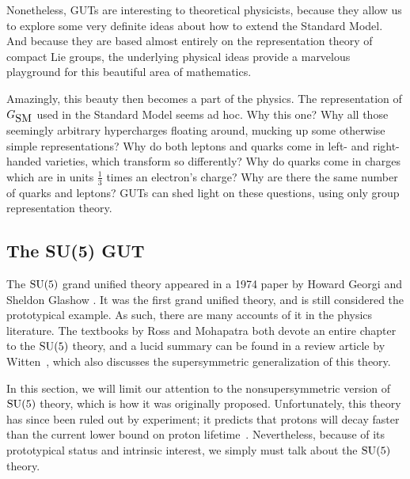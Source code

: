 \documentclass[12pt]{article}
\newcommand{\SU}{{\rm SU}}    %
\newcommand{\third}{\frac{1}{3}} %
\newcommand{\GSM}{{G_{\mbox{\rm SM}}}}  %
\begin{document}
Nonetheless, GUTs are interesting to theoretical physicists, because
they allow us to explore some very definite ideas about how to extend
the Standard Model. And because they are based almost entirely on the
representation theory of compact Lie groups, the underlying physical
ideas provide a marvelous playground for this beautiful area of
mathematics.

Amazingly, this beauty then becomes a part of the physics.  The
representation of $\GSM$ used in the Standard Model seems ad hoc.  Why
this one?  Why all those seemingly arbitrary hypercharges floating
around, mucking up some otherwise simple representations? Why do both
leptons and quarks come in left- and right-handed varieties, which
transform so differently?  Why do quarks come in charges which are in
units $\third$ times an electron's charge? Why are there the same
number of quarks and leptons?  GUTs can shed light on these questions,
using only group representation theory.

\subsection{The {\rm{SU(5)}} GUT} \label{sec:su(5)}

The $\SU(5)$ grand unified theory appeared in a 1974 paper by Howard
Georgi and Sheldon Glashow \cite{GeorgiGlashow:su(5)}. It was the
first grand unified theory, and is still considered the prototypical
example.  As such, there are many accounts of it in the physics
literature.  The textbooks by Ross \cite{ross:gut} and Mohapatra
\cite{mohapatra:us} both devote an entire chapter to the $\SU(5)$
theory, and a lucid summary can be found in a review article by
Witten~\cite{witten:grandunification}, which also
discusses the supersymmetric generalization of this theory.

In this section, we will limit our attention to the nonsupersymmetric version
of $\SU(5)$ theory, which is how it was originally proposed. Unfortunately,
this theory has since been ruled out by experiment; it predicts that protons
will decay faster than the current lower bound on proton
lifetime~\cite{pati:decay}.  Nevertheless, because of its prototypical
status and intrinsic interest, we simply must talk about the $\SU(5)$ theory.
\end{document}
